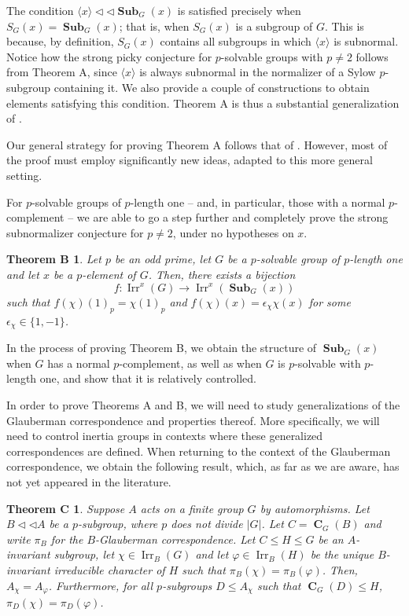 \documentclass[12pt]{amsart}
\DeclareMathOperator{\CB}{\mathbf{C}}
\DeclareMathOperator{\Sub}{\mathbf{Sub}}
\DeclareMathOperator{\Irr}{Irr}
\theoremstyle{remark}
\theoremstyle{definition}
\theoremstyle{plain}
\newtheorem*{thmB}{Theorem B}
\newtheorem*{thmC}{Theorem C}
\theoremstyle{definition}
\numberwithin{equation}{section}
\begin{document}
The condition $\langle x \rangle {\triangleleft}{\triangleleft} \Sub_G(x)$ is satisfied precisely when $S_G(x) = \Sub_G(x)$; that is, when $S_G(x)$ is a subgroup of $G$. This is because, by definition, $S_G(x)$ contains all subgroups in which $\langle x \rangle$ is subnormal. Notice how the strong picky conjecture for $p$-solvable groups with $p \neq 2$ follows from Theorem A, since $\langle x \rangle$ is always subnormal in the normalizer of a Sylow $p$-subgroup containing it. We also provide a couple of constructions to obtain elements satisfying this condition. Theorem A is thus a substantial generalization of \cite[Theorem A]{PickyPSolvable}.

Our general strategy for proving Theorem A follows that of \cite{PickyPSolvable}. However, most of the proof must employ significantly new ideas, adapted to this more general setting. 

For $p$-solvable groups of $p$-length one -- and, in particular, those with a normal $p$-complement -- we are able to go a step further and completely prove the strong subnormalizer conjecture for $p \neq 2$, under no hypotheses on $x$.

\begin{thmB}
	Let $p$ be an odd prime, let $G$ be a $p$-solvable group of $p$-length one and let $x$ be a $p$-element of $G$. Then, there exists a bijection $$f: \Irr^x(G) \to \Irr^x(\Sub_G(x))$$ such that $f(\chi)(1)_p = \chi(1)_p$ and $f(\chi)(x) = \epsilon_\chi \chi(x)$ for some $\epsilon_\chi \in \{1, -1\}$.
\end{thmB}

In the process of proving Theorem B, we obtain the structure of $\Sub_G(x)$ when $G$ has a normal $p$-complement, as well as when $G$ is $p$-solvable with $p$-length one, and show that it is relatively controlled.

In order to prove Theorems A and B, we will need to study generalizations of the Glauberman correspondence and properties thereof. More specifically, we will need to control inertia groups in contexts where these generalized correspondences are defined. When returning to the context of the Glauberman correspondence, we obtain the following result, which, as far as we are aware, has not yet appeared in the literature.

\begin{thmC}
	Suppose $A$ acts on a finite group $G$ by automorphisms. Let $B {\triangleleft}{\triangleleft} A$ be a $p$-subgroup, where $p$ does not divide $|G|$. Let $C = \CB_{G}(B)$ and write $\pi_B$ for the $B$-Glauberman correspondence. Let $C \leq H \leq G$ be an $A$-invariant subgroup, let $\chi \in \Irr_B(G)$ and let $\varphi \in \Irr_B(H)$ be the unique $B$-invariant irreducible character of $H$ such that $\pi_B(\chi) = \pi_B(\varphi)$. Then, $A_\chi = A_\varphi$. Furthermore, for all $p$-subgroups $D \leq A_\chi$ such that $\CB_{G}(D) \leq H$, $\pi_D(\chi) = \pi_D(\varphi)$.
\end{thmC}
\end{document}
